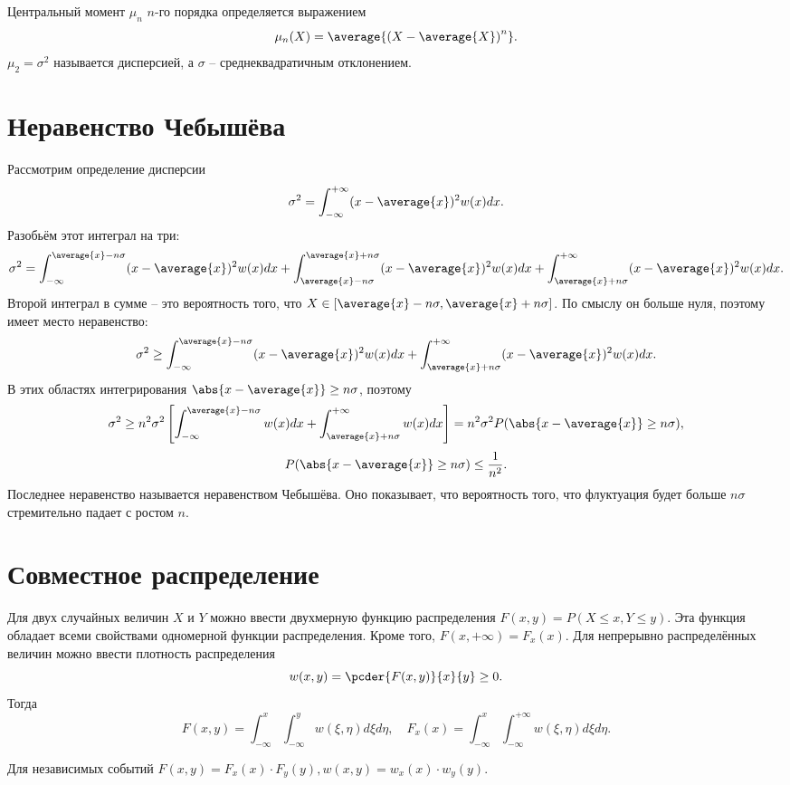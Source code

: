 Центральный момент \( \mu_n \) \( n \)-го порядка определяется выражением
\[
    \mu_n(X) = \average{\left(X - \average{X}\right)^n}.
\]
\( \mu_2 = \sigma^2 \) называется дисперсией, а \( \sigma \) --
среднеквадратичным отклонением.

\section{Неравенство Чебышёва}
    Рассмотрим определение дисперсии
    \[
        \sigma^2 = \int_{-\infty}^{+\infty} (x - \average{x})^2w(x)dx.
    \]
    Разобьём этот интеграл на три:
    \[
        \sigma^2 = \int_{-\infty}^{\average{x}-n\sigma}(x-\average{x})^2w(x)dx +
        \int_{\average{x}-n\sigma}^{\average{x}+n\sigma}(x-\average{x})^2w(x)dx+
        \int_{\average{x}+n\sigma}^{+\infty}(x-\average{x})^2w(x)dx.
    \]
    Второй интеграл в сумме -- это вероятность того, что
    \( X \in [\average{x} - n\sigma, \average{x} + n\sigma] \). По смыслу он
    больше нуля, поэтому имеет место неравенство:
    \[
        \sigma^2 \ge \int_{-\infty}^{\average{x}-n\sigma}(x-\average{x})^2w(x)dx +
        \int_{\average{x}+n\sigma}^{+\infty}(x-\average{x})^2w(x)dx.
    \]
    В этих областях интегрирования \( \abs{x-\average{x}} \ge n\sigma \),
    поэтому
    \[
        \sigma^2 \ge n^2\sigma^2 \left[
            \int_{-\infty}^{\average{x}-n\sigma}w(x)dx +
            \int_{\average{x}+n\sigma}^{+\infty}w(x)dx
        \right] = n^2\sigma^2P(\abs{x-\average{x}} \ge n\sigma),
    \]
    \[
        P(\abs{x-\average{x}} \ge n\sigma) \le \frac{1}{n^2}.
    \]
    Последнее неравенство называется неравенством Чебышёва. Оно показывает, что
    вероятность того, что флуктуация будет больше \( n\sigma \) стремительно
    падает с ростом \( n \).
\section{Совместное распределение}
Для двух случайных величин \( X \) и \( Y \) можно ввести двухмерную функцию
распределения \( F(x,y) = P(X \le x, Y \le y) \). Эта функция обладает всеми
свойствами одномерной функции распределения. Кроме того,
\( F(x, +\infty) = F_x(x) \). Для непрерывно распределённых величин можно ввести
плотность распределения
\[
    w(x,y) = \pcder{F(x,y)}{x}{y} \ge 0.
\]
Тогда
\[
    F(x, y) = \int_{-\infty}^x\int_{-\infty}^y w(\xi,\eta)d\xi d\eta,\quad
    F_x(x) = \int_{-\infty}^x\int_{-\infty}^{+\infty} w(\xi,\eta)d\xi d\eta.
\]

Для независимых событий
\( F(x,y) = F_x(x) \cdot F_y(y), w(x,y) = w_x(x) \cdot w_y(y) \).

